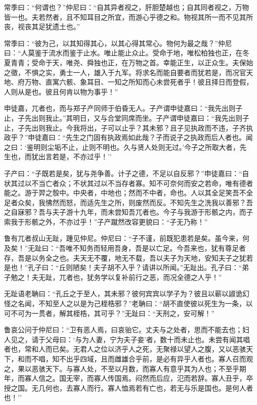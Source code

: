 \documentclass[]{article}
\begin{document}
常季曰：``何谓也？''仲尼曰：``自其异者视之，肝胆楚越也；自其同者视之，万物皆一也。夫若然者，且不知耳目之所宜，而游心乎德之和。物视其所一而不见其所丧，视丧其足犹遗土也。''

常季曰：``彼为己，以其知得其心，以其心得其常心。物何为最之哉？''仲尼曰：``人莫鉴于流水而鉴于止水。唯止能止众止。受命于地，唯松柏独也正，在冬夏青青；受命于天，唯尧、舜独也正，在万物之首。幸能正生，以正众生。夫保始之徵，不惧之实，勇士一人，雄入于九军。将求名而能自要者而犹若是，而况官天地、府万物、直寓六骸、象耳目、一知之所知而心未尝死者乎！彼且择日而登假，人则从是也。彼且何肯以物为事乎！''

申徒嘉，兀者也，而与郑子产同师于伯昏无人。子产谓申徒嘉曰：``我先出则子止，子先出则我止。''其明日，又与合堂同席而坐。子产谓申徒嘉曰：``我先出则子止，子先出则我止。今我将出，子可以止乎？其未邪？且子见执政而不违，子齐执政乎？''申徒嘉曰：``先生之门固有执政焉如此哉？子而说子之执政而后人者也。闻之曰：`鉴明则尘垢不止，止则不明也。久与贤人处则无过。'今子之所取大者，先生也，而犹出言若是，不亦过乎！''

子产曰：``子既若是矣，犹与尧争善。计子之德，不足以自反邪？''申徒嘉曰：``自状其过以不当亡者众；不状其过以不当存者寡。知不可奈何而安之若命，唯有德者能之。游于羿之彀中。中央者，中地也；然而不中者，命也。人以其全足笑吾不全足者众矣，我怫然而怒，而适先生之所，则废然而反。不知先生之洗我以善邪？吾之自寐邪？吾与夫子游十九年，而未尝知吾兀者也。今子与我游于形骸之内，而子索我于形骸之外，不亦过乎！''子产蹴然改容更貌曰：``子无乃称！''

鲁有兀者叔山无趾，踵见仲尼。仲尼曰：``子不谨，前既犯患若是矣。虽今来，何及矣！''无趾曰：``吾唯不知务而轻用吾身，吾是以亡足。今吾来也，犹有尊足者存，吾是以务全之也。夫天无不覆，地无不载，吾以夫子为天地，安知夫子之犹若是也！''孔子曰：``丘则陋矣！夫子胡不入乎？请讲以所闻。''无趾出。孔子曰：``弟子勉之！夫无趾，兀者也，犹务学以复补前行之恶，而况全德之人乎！''

无趾语老聃曰：``孔丘之于至人，其未邪？彼何宾宾以学子为？彼且以蕲以諔诡幻怪之名闻，不知至人之以是为己桎梏邪？''老聃曰：``胡不直使彼以死生为一条，以可不可为一贯者，解其桎梏，其可乎？''无趾曰：``天刑之，安可解！''

鲁哀公问于仲尼曰：``卫有恶人焉，曰哀骀它。丈夫与之处者，思而不能去也；妇人见之，请于父母曰：`与为人妻，宁为夫子妾'者，数十而未止也。未尝有闻其唱者也，常和人而已矣。无君人之位以济乎人之死，无聚禄以望人之腹，又以恶骇天下，和而不唱，知不出乎四域，且而雌雄合乎前，是必有异乎人者也。寡人召而观之，果以恶骇天下。与寡人处，不至以月数，而寡人有意乎其为人也；不至乎期年，而寡人信之。国无宰，而寡人传国焉。闷然而后应，氾而若辞。寡人丑乎，卒授之国。无几何也，去寡人而行。寡人恤焉若有亡也，若无与乐是国也。是何人者也！''
\end{document}
